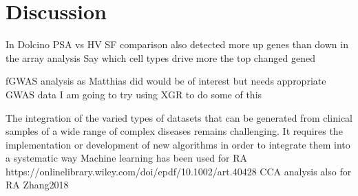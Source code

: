  

\section{Discussion}
%
In Dolcino PSA vs HV SF comparison also detected more up genes than down in the array analysis
Say which cell types drive more the top changed gened

fGWAS analysis as Matthias did would be of interest but needs appropriate GWAS data
I am going to try using XGR to do some of this 



The integration of the varied types of datasets that can be generated from clinical samples of a wide range of complex diseases remains challenging. It requires the implementation or development of new algorithms in order to integrate them into a systematic way
Machine learning has been used for RA https://onlinelibrary.wiley.com/doi/epdf/10.1002/art.40428
CCA analysis also for RA Zhang2018	





